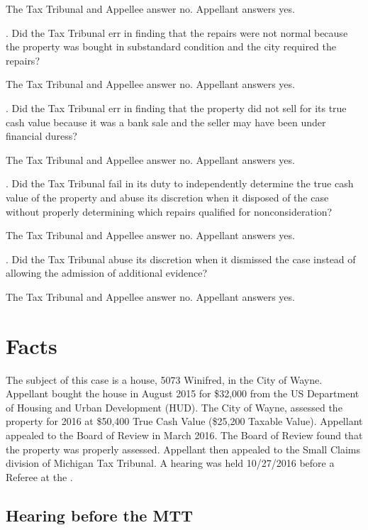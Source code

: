\documentclass[12pt,\documentclassflag]{michiganCourtOfAppealsBrief}
\begin{document}
The Tax Tribunal and Appellee answer no. Appellant answers yes. 
\vspace{\baselineskip}

. Did the Tax Tribunal err in finding that the repairs were not normal because the property was bought in substandard condition  and the city required the repairs?

The Tax Tribunal and Appellee answer no. Appellant answers yes.
\vspace{\baselineskip}

. Did the Tax Tribunal err in finding that the property did not sell for its true cash value because it was a bank sale and the seller may have been under financial duress?

The Tax Tribunal and Appellee answer no. Appellant answers yes. 
\vspace{\baselineskip}

. Did the Tax Tribunal fail in its duty to independently determine the true cash value of the property and abuse its discretion when it disposed of the case without properly determining which repairs qualified for nonconsideration?

The Tax Tribunal and Appellee answer no. Appellant answers yes.
\vspace{\baselineskip}

. Did the Tax Tribunal abuse its discretion when it dismissed the case instead of allowing the admission of additional evidence?

The Tax Tribunal and Appellee answer no. Appellant answers yes. 

\newpage 

\section{Facts}
The subject of this case is a house, 5073 Winifred, in the City of Wayne. Appellant bought the house in August 2015 for \$32,000 from the US Department of Housing and Urban Development (HUD). The City of Wayne, assessed the property for 2016 at \$50,400 True Cash Value (\$25,200 Taxable Value). Appellant appealed to the Board of Review in March 2016. The Board of Review found that the property was properly assessed. Appellant then appealed to the Small Claims division of Michigan Tax Tribunal. A hearing was held 10/27/2016 before a Referee at the \MTT.

\subsection{Hearing before the MTT}
\end{document}
